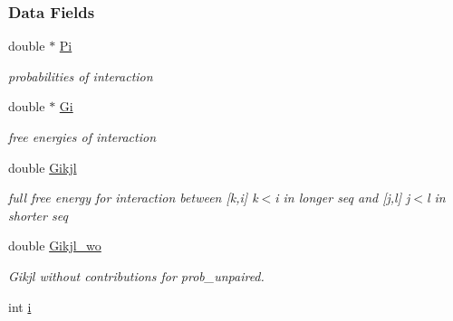 \subsubsection*{Data Fields}
\begin{DoxyCompactItemize}
\item 
\hypertarget{group__data__structures_a1fc8b3860c083f164daa9712690a3a56}{double $\ast$ \hyperlink{group__data__structures_a1fc8b3860c083f164daa9712690a3a56}{Pi}}\label{group__data__structures_a1fc8b3860c083f164daa9712690a3a56}

\begin{DoxyCompactList}\small\item\em probabilities of interaction \end{DoxyCompactList}\item 
\hypertarget{group__data__structures_a54f8183542fff4c32ab7ace49a16c02c}{double $\ast$ \hyperlink{group__data__structures_a54f8183542fff4c32ab7ace49a16c02c}{Gi}}\label{group__data__structures_a54f8183542fff4c32ab7ace49a16c02c}

\begin{DoxyCompactList}\small\item\em free energies of interaction \end{DoxyCompactList}\item 
\hypertarget{group__data__structures_ad58303190f9e085c3ab59890cbf61223}{double \hyperlink{group__data__structures_ad58303190f9e085c3ab59890cbf61223}{Gikjl}}\label{group__data__structures_ad58303190f9e085c3ab59890cbf61223}

\begin{DoxyCompactList}\small\item\em full free energy for interaction between \mbox{[}k,i\mbox{]} k$<$i in longer seq and \mbox{[}j,l\mbox{]} j$<$l in shorter seq \end{DoxyCompactList}\item 
\hypertarget{group__data__structures_a41793812abae560805414761fec398fe}{double \hyperlink{group__data__structures_a41793812abae560805414761fec398fe}{Gikjl\-\_\-wo}}\label{group__data__structures_a41793812abae560805414761fec398fe}

\begin{DoxyCompactList}\small\item\em Gikjl without contributions for prob\-\_\-unpaired. \end{DoxyCompactList}\item 
\hypertarget{group__data__structures_ab6d031a21388be8763b75ea74c937f17}{int \hyperlink{group__data__structures_ab6d031a21388be8763b75ea74c937f17}{i}}\label{group__data__structures_ab6d031a21388be8763b75ea74c937f17}


\end{DoxyCompactItemize}
